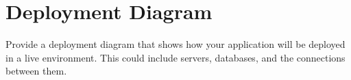 \section{Deployment Diagram}

Provide a deployment diagram that shows how your application will be deployed in a live environment. This could include servers, databases, and the connections between them.